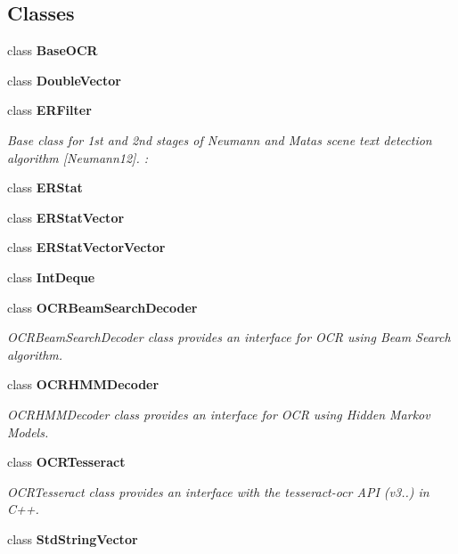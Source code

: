 \subsection*{Classes}
\begin{DoxyCompactItemize}
\item 
class {\bfseries Base\+O\+CR}
\item 
class {\bfseries Double\+Vector}
\item 
class {\bfseries E\+R\+Filter}
\begin{DoxyCompactList}\small\item\em Base class for 1st and 2nd stages of Neumann and Matas scene text detection algorithm \mbox{[}Neumann12\mbox{]}. \+: \end{DoxyCompactList}\item 
class {\bfseries E\+R\+Stat}
\item 
class {\bfseries E\+R\+Stat\+Vector}
\item 
class {\bfseries E\+R\+Stat\+Vector\+Vector}
\item 
class {\bfseries Int\+Deque}
\item 
class {\bfseries O\+C\+R\+Beam\+Search\+Decoder}
\begin{DoxyCompactList}\small\item\em O\+C\+R\+Beam\+Search\+Decoder class provides an interface for O\+CR using Beam Search algorithm. \end{DoxyCompactList}\item 
class {\bfseries O\+C\+R\+H\+M\+M\+Decoder}
\begin{DoxyCompactList}\small\item\em O\+C\+R\+H\+M\+M\+Decoder class provides an interface for O\+CR using Hidden Markov Models. \end{DoxyCompactList}\item 
class {\bfseries O\+C\+R\+Tesseract}
\begin{DoxyCompactList}\small\item\em O\+C\+R\+Tesseract class provides an interface with the tesseract-\/ocr A\+PI (v3..) in C++. \end{DoxyCompactList}\item 
class {\bfseries Std\+String\+Vector}
\end{DoxyCompactItemize}
